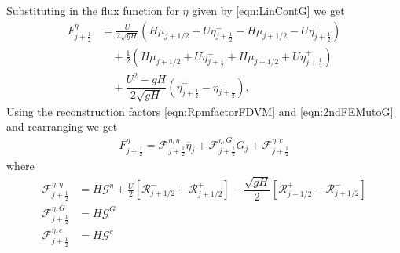 Substituting in the flux function for $\eta$ given by \eqref{eqn:LinContG} we get
\begin{align*}
F^\eta_{j+\frac{1}{2}} &= \frac{U}{2 \sqrt{gH}} \left( H\mu_{j+1/2} + U\eta^-_{j+\frac{1}{2}} -  H\mu_{j+1/2} - U \eta^+_{j+\frac{1}{2}} \right)   \nonumber \\ & \quad + \frac{1}{2}\left(H\mu_{j+1/2} + U\eta^-_{j+\frac{1}{2}} +  H\mu_{j+1/2} + U \eta^+_{j+\frac{1}{2}}\right) \nonumber \\ &\quad + \dfrac{U^2 - gH}{2\sqrt{g H}} \left (\eta^+_{j+\frac{1}{2}} - \eta^-_{j+\frac{1}{2}} \right).
\end{align*}
Using the reconstruction factors \eqref{eqn:RpmfactorFDVM} and \eqref{eqn:2ndFEMutoG} and rearranging we get
	\begin{align*}
	F^\eta_{j+\frac{1}{2}} = \mathcal{F}^{\eta, \eta}_{j+\frac{1}{2}} \overline{\eta}_{j} + \mathcal{F}^{\eta, G}_{j+\frac{1}{2}} \overline{G}_{j} + \mathcal{F}^{\eta, c}_{j+\frac{1}{2}}
	\end{align*}
	where
	\begin{align*}
	\mathcal{F}^{\eta, \eta}_{j+\frac{1}{2}} &=  H\mathcal{G}^{\eta}  + \frac{U}{2}\left[ \mathcal{R}^-_{j+1/2} +  \mathcal{R}^+_{j+1/2}\right]- \dfrac{\sqrt{gH}}{2} \left [ \mathcal{R}^+_{j+1/2} - \mathcal{R}^-_{j+1/2} \right ]\\
	\mathcal{F}^{\eta, G}_{j+\frac{1}{2}} &=  H \mathcal{G}^G\\
	\mathcal{F}^{\eta, c}_{j+\frac{1}{2}} &=  H\mathcal{G}^c
	\end{align*}

